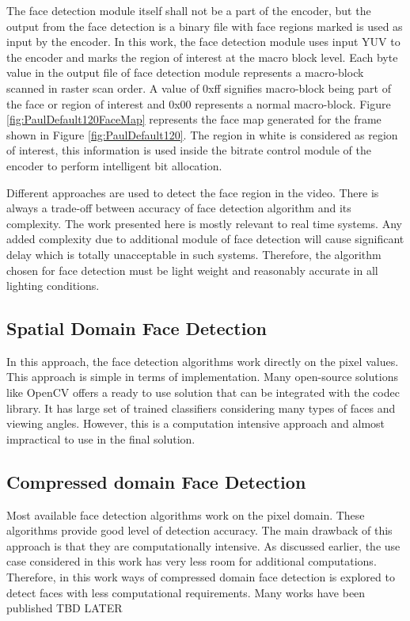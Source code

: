 \documentclass[11pt]{article} %
\begin{document}
 The face detection module itself shall not be a part of the encoder, but the output from the face detection is a binary file with face regions marked is used as input by the encoder. In this work, the face detection module uses input YUV to the encoder and marks the region of interest at the macro block level. Each byte value in the output file of face detection module represents a macro-block scanned in raster scan order. A value of 0xff signifies macro-block being part of the face or region of interest and 0x00 represents a normal macro-block. Figure \ref{fig:PaulDefault120FaceMap} represents the face map generated for the frame shown in Figure \ref{fig:PaulDefault120}. The region in white is considered as region of interest, this information is used inside the bitrate control module of the encoder to perform intelligent bit allocation.

Different approaches are used to detect the face region in the video. There is always a trade-off between accuracy of face detection algorithm and its complexity. The work presented here is mostly relevant to real time systems. Any added complexity due to additional module of face detection will cause significant delay which is totally unacceptable in such systems. Therefore, the algorithm chosen for face detection must be light weight and reasonably accurate in all lighting conditions. 

\subsection{Spatial Domain Face Detection}
In this approach, the face detection algorithms work directly on the pixel values. This approach is simple in terms of implementation. Many open-source solutions like OpenCV offers a ready to use solution that can be integrated with the codec library. It has large set of trained classifiers considering many types of faces and viewing angles. However, this is a computation intensive approach and almost impractical to use in the final solution. 
\subsection{Compressed domain Face Detection}
Most available face detection algorithms work on the pixel domain. These algorithms provide good level of detection accuracy. The main drawback of this approach is that they are computationally intensive. As discussed earlier, the use case considered in this work has very less room for additional computations. Therefore, in this work ways of compressed domain face detection is explored to detect faces with less computational requirements. 
Many works have been published
TBD LATER
%
%
% 
\end{document}
